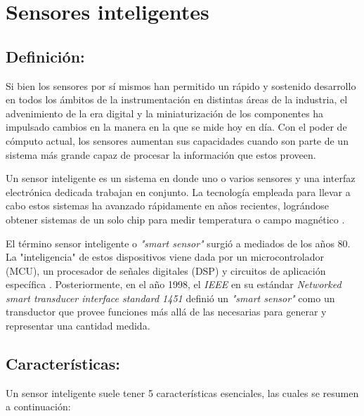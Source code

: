 \section{Sensores inteligentes}

\subsection{Definición:}

Si bien los sensores por sí mismos han permitido un rápido y sostenido desarrollo en todos los ámbitos de la instrumentación en distintas áreas de la industria, el advenimiento de la era digital y la miniaturización de los componentes ha impulsado cambios en la manera en la que se mide hoy en día. Con el poder de cómputo actual, los sensores aumentan sus capacidades cuando son parte de un sistema más grande capaz de procesar la información que estos proveen.



Un sensor inteligente es un sistema en donde uno o varios sensores y una interfaz electrónica dedicada trabajan en conjunto. La tecnología empleada para llevar a cabo estos sistemas ha avanzado rápidamente en años recientes, lográndose obtener sistemas de un solo chip para medir temperatura o campo magnético \citep{nagayama2007structural}.


El término sensor inteligente o \textit{"smart sensor"} surgió a mediados de los años 80. La "inteligencia" de estos dispositivos viene dada por un microcontrolador (MCU), un procesador de señales digitales (DSP) y circuitos de aplicación específica \citep{frank2002understanding}. Posteriormente, en el año 1998, el \textit{IEEE} en su estándar \textit{Networked smart transducer interface standard 1451} definió un \textit{"smart sensor"} como un transductor que provee funciones más allá de las necesarias para generar y representar una cantidad medida.


\subsection{Características:}

Un sensor inteligente suele tener 5 características esenciales, las cuales se resumen a continuación:

